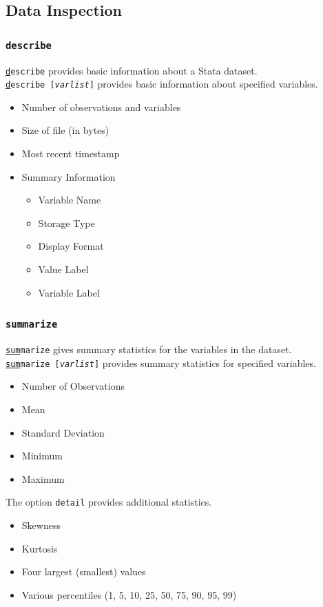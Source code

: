 \documentclass{beamer}
\begin{document}
\subsection{Data Inspection}

\begin{frame}
	\frametitle{\texttt{describe}}
		\texttt{\underline{d}escribe} provides basic information about a Stata dataset. \\
		\texttt{\underline{d}escribe [\textit{varlist}]} provides basic information about specified variables.
			\begin{itemize}
			\item Number of observations and variables
			\item Size of file (in bytes)
			\item Most recent timestamp
			\item Summary Information
				\begin{itemize}
					\item Variable Name
					\item Storage Type
					\item Display Format
					\item Value Label
					\item Variable Label
				\end{itemize}
			\end{itemize}
\end{frame}

\begin{frame}
	\frametitle{\texttt{summarize}} 
		\texttt{\underline{sum}marize} gives summary statistics for the variables in the dataset. \\
		\texttt{\underline{sum}marize [\textit{varlist}]} provides summary statistics for specified variables.
			\begin{itemize}
				\item Number of Observations
				\item Mean
				\item Standard Deviation
				\item Minimum
				\item Maximum
			\end{itemize}
		The option \texttt{detail} provides additional statistics.
			\begin{itemize}
				\item Skewness
				\item Kurtosis
				\item Four largest (smallest) values
				\item Various percentiles (1, 5, 10, 25, 50, 75, 90, 95, 99)
			\end{itemize}
\end{frame}
\end{document}
